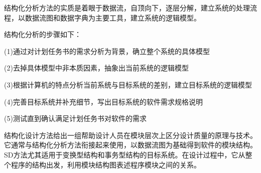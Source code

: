 结构化分析方法的实质是着眼于数据流，自顶向下，逐层分解，建立系统的处理流程，以数据流图和数据字典为主要工具，建立系统的逻辑模型。

结构化分析的步骤如下：

(1)通过对计划任务书的需求分析为背景，确立整个系统的具体模型

(2)去掉具体模型中非本质因素，抽象出当前系统的逻辑模型

(3)根据计算机的特点分析当前系统与目标系统的差别，建立目标系统的逻辑模型

(4)完善目标系统并补充细节，写出目标系统的软件需求规格说明

(5)测试直到确认满足计划任务书对软件的需求

结构化设计方法给出一组帮助设计人员在模块层次上区分设计质量的原理与技术。它通常与结构化分析方法衔接起来使用，以数据流图为基础得到软件的模块结构。SD方法尤其适用于变换型结构和事务型结构的目标系统。在设计过程中，它从整个程序的结构出发，利用模块结构图表述程序模块之间的关系。








